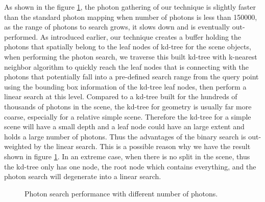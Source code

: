 As shown in the figure \ref{fig:photon_search_1}, the photon gathering of our technique is slightly faster than the standard photon mapping when number of photons is less than 150000, as the range of photons to search grows, it slows down and is eventually out-performed. As introduced earlier, our technique creates a buffer holding the photons that spatially belong to the leaf nodes of kd-tree for the scene objects, when performing the photon search, we traverse this built kd-tree with k-nearest neighbor algorithm to quickly reach the leaf nodes that is connecting with the photons that potentially fall into a pre-defined search range from the query point using the bounding box information of the kd-tree leaf nodes, then perform a linear search at this level. Compared to a kd-tree built for the hundreds of thousands of photons in the scene, the kd-tree for geometry is usually far more coarse, especially for a relative simple scene. Therefore the kd-tree for a simple scene will have a small depth and a leaf node could have an large extent and holds a large number of photons. Thus the advantages of the binary search is out-weighted by the linear search. This is a possible reason why we have the result shown in figure \ref{fig:photon_search_1}. In an extreme case, when there is no split in the scene, thus the kd-tree only has one node, the root node which contains everything, and the photon search will degenerate into a linear search.

\begin{figure}[ftp]
    \centering
    \renewcommand{\thefigure}{\thechapter.\arabic{figure}}
    \caption[Photon search performance with different number of photons]{Photon search performance with different number of photons. }
    \label{fig:photon_search_1}
\end{figure}

